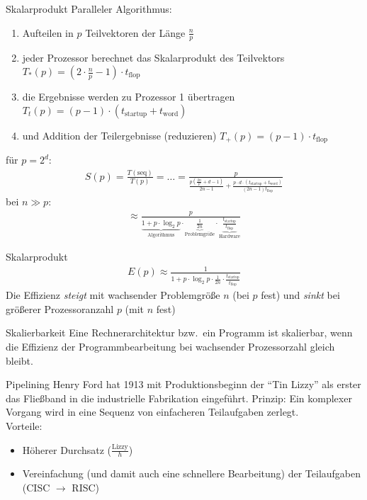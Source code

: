 \begin{example}[Speedup]{Skalarprodukt}
    Paralleler Algorithmus:
    \begin{enumerate}
        \item Aufteilen in $p$ Teilvektoren der Länge $\frac{n}{p}$
        \item jeder Prozessor berechnet das Skalarprodukt des Teilvektors $T_* (p) = \left(2 \cdot \frac{n}{p} - 1\right) \cdot t_\text{flop}$
        \item die Ergebnisse werden zu Prozessor 1 übertragen $T_t (p) = (p - 1) \cdot (t_\text{startup} + t_\text{word})$
        \item und Addition der Teilergebnisse (reduzieren) $T_+ (p) = (p - 1) \cdot t_\text{flop}$
    \end{enumerate}
    für $p=2^d$:
    \begin{align*}
        S(p) = \frac{T(\text{seq})}{T(p)} = \ldots =
        \frac{p}{\frac{p(\frac{2n}{p} + d-1)}{2n-1} + \frac{p\cdot d\cdot (t_\text{startup} + t_\text{word})}{(2n - 1)t_\text{flop}}}
    \end{align*}
    bei $n\gg p$:
    \begin{align*}
        \approx\frac{p}{
        \underbrace{1 + p\cdot \log_2 p}_{\text{Algorithmus}} \cdot
        \underbrace{\frac{1}{2n}}_{\text{Problemgröße}} \cdot
        \underbrace{\frac{t_\text{startup}}{t_\text{flop}}}_{\text{Hardware}}}
    \end{align*}
\end{example}

\begin{example}[Effizienz]{Skalarprodukt}
    \begin{align*}
        E(p)\approx\frac{1}{1 + p\cdot\log_2 p\cdot \frac{1}{2n} \cdot \frac{t_\text{startup}}{t_\text{flop}}}
    \end{align*}
    Die Effizienz \emph{steigt} mit wachsender Problemgröße $n$ (bei $p$ fest) und
    \emph{sinkt} bei größerer Prozessoranzahl $p$ (mit $n$ fest)
\end{example}

\begin{defi}{Skalierbarkeit}
    Eine Rechnerarchitektur bzw.\ ein Programm ist skalierbar,
    wenn die Effizienz der Programmbearbeitung bei wachsender Prozessorzahl gleich bleibt.
\end{defi}

\begin{defi}{Pipelining}
    Henry Ford hat 1913 mit Produktionsbeginn der \enquote{Tin Lizzy} als erster das Fließband in die industrielle Fabrikation eingeführt.
    Prinzip: Ein komplexer Vorgang wird in eine Sequenz von einfacheren Teilaufgaben zerlegt. \\
    Vorteile:
    \begin{itemize}
        \item Höherer Durchsatz ($\frac{\text{Lizzy}}{h}$)
        \item Vereinfachung (und damit auch eine schnellere Bearbeitung) der Teilaufgaben (CISC $\to$ RISC)
    \end{itemize}
\end{defi}